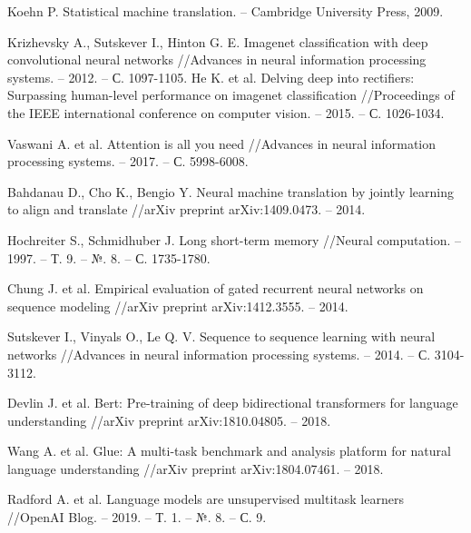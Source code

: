 \begingroup 
\renewcommand{\section}[2]{\anonsection{Список используемых источников}}
\begin{thebibliography}{00}

    Koehn P. Statistical machine translation. – Cambridge University Press, 2009.
    
    Krizhevsky A., Sutskever I., Hinton G. E. Imagenet classification with deep convolutional neural networks //Advances in neural information processing systems. – 2012. – С. 1097-1105.
    He K. et al. Delving deep into rectifiers: Surpassing human-level performance on imagenet classification //Proceedings of the IEEE international conference on computer vision. – 2015. – С. 1026-1034.
    
    Vaswani A. et al. Attention is all you need //Advances in neural information processing systems. – 2017. – С. 5998-6008.
    
    Bahdanau D., Cho K., Bengio Y. Neural machine translation by jointly learning to align and translate //arXiv preprint arXiv:1409.0473. – 2014.
    
    Hochreiter S., Schmidhuber J. Long short-term memory //Neural computation. – 1997. – Т. 9. – №. 8. – С. 1735-1780.
    
    Chung J. et al. Empirical evaluation of gated recurrent neural networks on sequence modeling //arXiv preprint arXiv:1412.3555. – 2014.
    
    Sutskever I., Vinyals O., Le Q. V. Sequence to sequence learning with neural networks //Advances in neural information processing systems. – 2014. – С. 3104-3112.
    
    Devlin J. et al. Bert: Pre-training of deep bidirectional transformers for language understanding //arXiv preprint arXiv:1810.04805. – 2018.
    
    Wang A. et al. Glue: A multi-task benchmark and analysis platform for natural language understanding //arXiv preprint arXiv:1804.07461. – 2018.
    
    Radford A. et al. Language models are unsupervised multitask learners //OpenAI Blog. – 2019. – Т. 1. – №. 8. – С. 9.
    

\end{thebibliography}
